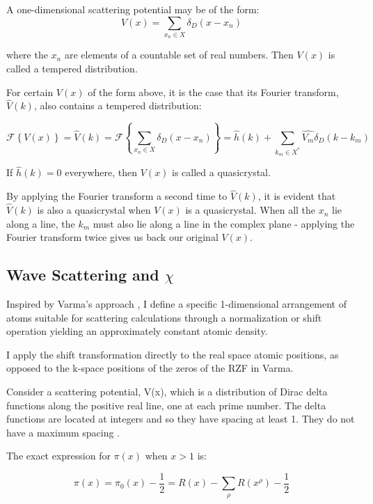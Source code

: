 \documentclass[11pt, oneside]{article}
\begin{document}
A one-dimensional scattering potential may be of the form:
\begin{equation}
V(x) = \sum_{x_n \in X}\delta_D(x - x_n)
\end{equation} 
 
where the $x_n$ are elements of a countable set of real numbers. Then $V(x)$ is called a tempered distribution.

For certain $V(x)$ of the form above, it is the case that its Fourier transform, $\hat{V}(k)$, also contains a tempered distribution:
  
\begin{equation}
 \label{eq: RiemannFourier}
 \mathcal{F}\left \{V(x)\right \} = \hat{V}(k) = \mathcal{F}\left \{ \sum_{x_n \in X}\delta_D(x - x_n) \right \} = \hat{h}(k) +  \sum_{k_m \in X^{*}} \hat{V_{m}} \delta_D(k - k_{m})
\end{equation}

If $\hat{h}(k) = 0$ everywhere, then $V(x)$ is called a quasicrystal.

By applying the Fourier transform a second time to $\hat{V}(k)$, it is evident that $\hat{V}(k)$ is also a quasicrystal when $V(x)$ is a quasicrystal. When all the $x_n$ lie along a line, the $k_m$ must also lie along a line in the complex plane - applying the Fourier transform twice gives us back our original $V(x)$.

\subsection{Wave Scattering and $\chi$}
Inspired by Varma's approach \cite{Varma2016}, I define a specific 1-dimensional arrangement of atoms suitable for scattering calculations through a normalization or shift operation yielding an approximately constant atomic density.

I apply the shift transformation directly to the real space atomic positions, as opposed to the k-space positions of the zeros of the RZF in Varma.

Consider a scattering potential, V(x), which is a distribution of Dirac delta functions along the positive real line, one at each prime number. 
The delta functions are located at integers and so they have spacing at least 1. They do not have a maximum spacing \cite{PrimeSpacing}.

The exact expression \cite{Riemann} for $\pi(x)$ when $x>1$ is:

\begin{equation}
\pi(x) = \pi_0(x) - \frac{1}{2} = R(x) - \sum_{\rho}R(x^{\rho}) - \frac{1}{2}
\end{equation}
\end{document}
